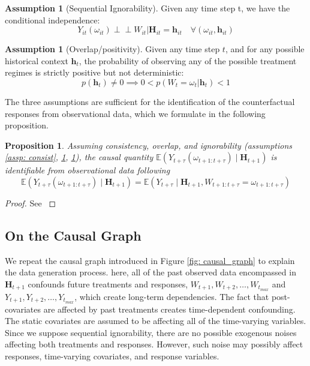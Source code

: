 \documentclass{article}
\newcommand{\indep}{\perp \!\!\! \perp}
\theoremstyle{plain}
\newtheorem{proposition}[theorem]{Proposition}
\theoremstyle{definition}
\newtheorem{assumption}[theorem]{Assumption}
\theoremstyle{remark}
\begin{document}
\begin{assumption}[Sequential Ignorability]
Given any time step t, we have the conditional independence:
\begin{equation*}
    Y_{it}(\omega_{it}) \indep  W_{it}| \mathbf{H}_{it} = \mathbf{h}_{it} \quad \forall (\omega_{it},\mathbf{h}_{it})
\end{equation*}
    \label{assp: ignorability}
\end{assumption}


\begin{assumption}[Overlap/positivity]
Given any time step $t$, and for any possible historical context $\mathbf{h}_t$, the probability of observing any of the possible treatment regimes is strictly positive but not deterministic:
    \begin{equation*}
        p(\mathbf{h}_t) \neq 0 \implies  0 < p(W_t =\omega_{t}|\mathbf{h}_t) < 1
    \end{equation*}
\label{assp: overlap}
\end{assumption}

The three assumptions are sufficient for the identification of the counterfactual responses from observational data, which we formulate in the following proposition. 

\begin{proposition}
    Assuming consistency, overlap, and ignorability  (assumptions \ref{assp: consist}, \ref{assp: ignorability}, \ref{assp: overlap}), the causal quantity $\mathbb{E}(Y_{t+\tau}(\omega_{t+1:t+\tau})\mid \mathbf{H}_{t+1})$ is identifiable from observational data following 
    \begin{equation*}
        \mathbb{E}(Y_{t+\tau}(\omega_{t+1:t+\tau})\mid \mathbf{H}_{t+1}) = \mathbb{E}\left(Y_{t+\tau}\mid \mathbf{H}_{t+1}, W_{t+1:t+\tau} = \omega_{t+1:t+\tau}\right)
    \end{equation*}
\end{proposition}

\begin{proof}
    See \cite{robins-time-varying-exposures}
\end{proof}
\subsection{On the Causal Graph}
\label{subsect: causal_graph}
We repeat the causal graph introduced in Figure \ref{fig: causal_graph} to explain the data generation process. here, all of the past observed data encompassed in $\mathbf{H}_{t+1}$ confounds future treatments and responses, $W_{t+1}, W_{t+2}, \dots, W_{t_{max}}$ and $Y_{t+1}, Y_{t+2}, \dots, Y_{t_{max}}$, which create long-term dependencies. The fact that post-covariates are affected by past treatments creates time-dependent confounding. The static covariates are assumed to be affecting all of the time-varying variables. Since we suppose sequential ignorability, there are no possible exogenous noises affecting both treatments and responses. However, such noise may possibly affect responses, time-varying covariates, and response variables. 
\end{document}
